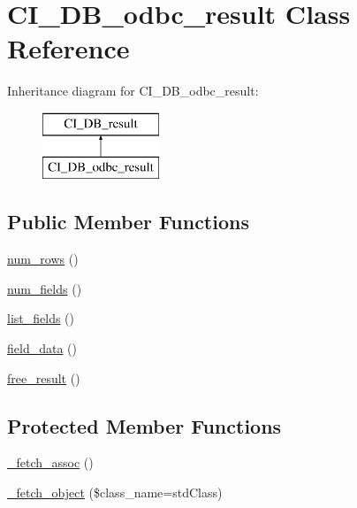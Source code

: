\hypertarget{class_c_i___d_b__odbc__result}{}\section{C\+I\+\_\+\+D\+B\+\_\+odbc\+\_\+result Class Reference}
\label{class_c_i___d_b__odbc__result}
Inheritance diagram for C\+I\+\_\+\+D\+B\+\_\+odbc\+\_\+result\+:\begin{figure}[H]
\begin{center}
\leavevmode
\includegraphics[height=2.000000cm]{class_c_i___d_b__odbc__result}
\end{center}
\end{figure}
\subsection*{Public Member Functions}
\begin{DoxyCompactItemize}
\item 
\mbox{\hyperlink{class_c_i___d_b__odbc__result_a218657c303ee499b97710ab0cd2f5d6e}{num\+\_\+rows}} ()
\item 
\mbox{\hyperlink{class_c_i___d_b__odbc__result_af831bf363e4d7d661a717a4932af449d}{num\+\_\+fields}} ()
\item 
\mbox{\hyperlink{class_c_i___d_b__odbc__result_a50b54eb4ea7cfd039740f532988ea776}{list\+\_\+fields}} ()
\item 
\mbox{\hyperlink{class_c_i___d_b__odbc__result_a84bffd65e53902ade1591716749a33e3}{field\+\_\+data}} ()
\item 
\mbox{\hyperlink{class_c_i___d_b__odbc__result_aad2d98d6beb3d6095405356c6107b473}{free\+\_\+result}} ()
\end{DoxyCompactItemize}
\subsection*{Protected Member Functions}
\begin{DoxyCompactItemize}
\item 
\mbox{\hyperlink{class_c_i___d_b__odbc__result_a43a9a92817f1334a1c10752ec44275a0}{\+\_\+fetch\+\_\+assoc}} ()
\item 
\mbox{\hyperlink{class_c_i___d_b__odbc__result_a60806be6a9c2488820813c2a7f4fef71}{\+\_\+fetch\+\_\+object}} (\$class\+\_\+name=\textquotesingle{}std\+Class\textquotesingle{})
\end{DoxyCompactItemize}
